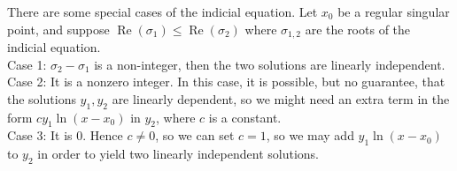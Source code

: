 There are some special cases of the indicial equation.
Let $x_0$ be a regular singular point, and suppose $\operatorname{Re}(\sigma_1)\le\operatorname{Re}(\sigma_2)$ where $\sigma_{1,2}$ are the roots of the indicial equation.\\
Case 1: $\sigma_2-\sigma_1$ is a non-integer, then the two solutions are linearly independent.\\
Case 2: It is a nonzero integer.
In this case, it is possible, but no guarantee, that the solutions $y_1,y_2$ are linearly dependent, so we might need an extra term in the form $cy_1\ln(x-x_0)$ in $y_2$, where $c$ is a constant.\\
Case 3: It is $0$.
Hence $c\neq 0$, so we can set $c=1$, so we may add $y_1\ln(x-x_0)$ to $y_2$ in order to yield two linearly independent solutions.